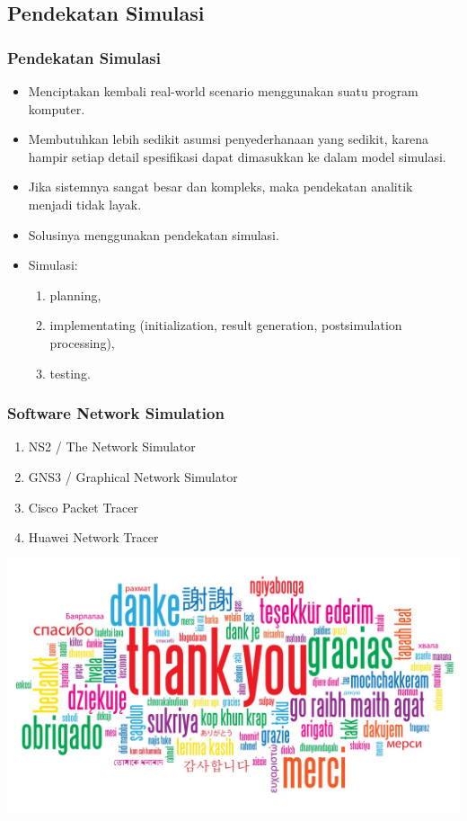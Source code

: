 \documentclass[pdflatex,compress]{beamer}
\begin{document}
\subsection{Pendekatan Simulasi}
\begin{frame}
	\frametitle{Pendekatan Simulasi}
	\begin{itemize}
		\item Menciptakan kembali real-world scenario menggunakan suatu program komputer.
		\item Membutuhkan lebih sedikit asumsi penyederhanaan yang sedikit, karena hampir setiap detail spesifikasi dapat dimasukkan ke dalam model simulasi.
		\item Jika sistemnya sangat besar dan kompleks, maka pendekatan analitik menjadi tidak layak.
		\item Solusinya menggunakan pendekatan simulasi.
		\item Simulasi:
		\begin{enumerate}
			\item planning,
			\item implementating (initialization, result generation, postsimulation processing),
			\item testing.
		\end{enumerate}
	\end{itemize}
\end{frame}

\begin{frame}
	\frametitle{Software Network Simulation}
	\begin{enumerate}
		\item NS2 / The Network Simulator
		\item GNS3 / Graphical Network Simulator
		\item Cisco Packet Tracer
		\item Huawei Network Tracer
	\end{enumerate}
\end{frame}

\begin{frame}
	\begin{center}
		\includegraphics[width=\linewidth]{../../img/thank_you}
	\end{center}
\end{frame}
\end{document}
